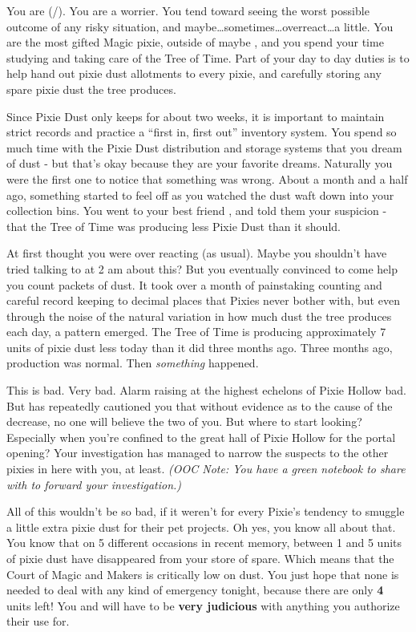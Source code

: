 \documentclass[char]{PP}
\begin{document}
\name{\cMTree{}}

You are \cMTree{} (\cMTree{\They}/\cMTree{\Them}). You are a worrier. You tend toward seeing the worst possible outcome of any risky situation, and maybe\ldots sometimes\ldots overreact\ldots a little. You are the most gifted Magic pixie, outside of maybe \cMHead{} \cMHead{\themself}, and you spend your time studying and taking care of the Tree of Time. Part of your day to day duties is to help hand out pixie dust allotments to every pixie, and carefully storing any spare pixie dust the tree produces.

Since Pixie Dust only keeps for about two weeks, it is important to maintain strict records and practice a “first in, first out” inventory system. You spend so much time with the Pixie Dust distribution and storage systems that you dream of dust - but that’s okay because they are your favorite dreams. Naturally you were the first one to notice that something was wrong. About a month and a half ago, something started to feel off as you watched the dust waft down into your collection bins. You went to your best friend \cSHelp{}, and told them your suspicion - that the Tree of Time was producing less Pixie Dust than it should.

At first \cSHelp{} thought you were over reacting (as usual). Maybe you shouldn’t have tried talking to at 2 am about this? But you eventually convinced \cSHelp{\them} to come help you count packets of dust. It took over a month of painstaking counting and careful record keeping to decimal places that Pixies never bother with, but even through the noise of the natural variation in how much dust the tree produces each day, a pattern emerged. The Tree of Time is producing approximately 7 units of pixie dust less today than it did three months ago. Three months ago, production was normal. Then \textit{something} happened.

This is bad. Very bad. Alarm raising at the highest echelons of Pixie Hollow bad. But \cSHelp{} has repeatedly cautioned you that without evidence as to the cause of the decrease, no one will believe the two of you. But where to start looking? Especially when you’re confined to the great hall of Pixie Hollow for the portal opening?  Your investigation has managed to narrow the suspects to the other pixies in here with you, at least. \textit{(OOC Note: You have a green notebook to share with \cSHelp{} to forward your investigation.)}

All of this wouldn’t be so bad, if it weren’t for every Pixie’s tendency to smuggle a little extra pixie dust for their pet projects. Oh yes, you know all about that. You know that on 5 different occasions in recent memory, between 1 and 5 units of pixie dust have disappeared from your store of spare. Which means that the Court of Magic and Makers is critically low on dust. You just hope that none is needed to deal with any kind of emergency tonight, because there are only \textbf{4} units left! You and \cMHead{} will have to be \textbf{very judicious} with anything you authorize their use for.
\end{document}
